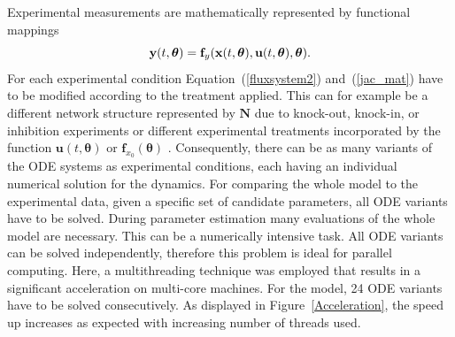 \documentclass[12pt,a4paper]{scrartcl}
\begin{document}
Experimental measurements are mathematically represented by functional mappings
\begin{equation}
    {\bf y}(t,{\boldsymbol \theta}) = {\bf f}_y({\bf x}(t,{\boldsymbol \theta}),{\bf u}(t,{\boldsymbol 
\theta}),{\boldsymbol \theta}). \label{eq:obs}
\end{equation}
For each experimental condition Equation~(\ref{fluxsystem2}) and~(\ref{jac_mat}) have to 
be modified according to the treatment applied. This can for example be a different 
network structure represented by $\mathbf{N}$ due to knock-out, knock-in, or inhibition 
experiments or different experimental treatments incorporated by the function $\mathbf{u}
(t, \boldsymbol{\theta})$ or $\mathbf{f}_{x_0}(\boldsymbol{\theta})$ . Consequently, there 
can be as many variants of the ODE systems as experimental conditions, each having an 
individual numerical solution for the dynamics. For comparing the whole model to 
the experimental data, given a specific set of candidate parameters, all ODE variants have 
to be solved. During parameter estimation many evaluations of the whole model are 
necessary. This can be a numerically intensive task. All ODE variants can be solved 
independently, therefore this problem is ideal for parallel computing. Here, a multithreading 
technique was employed that results in a significant acceleration on multi-core machines. 
For the \citet{Bachmann:2011fk} model, 24 ODE variants have to be solved consecutively. 
As displayed in Figure~\ref{Acceleration}, the speed up increases as expected with 
increasing number of threads used.
\end{document}
